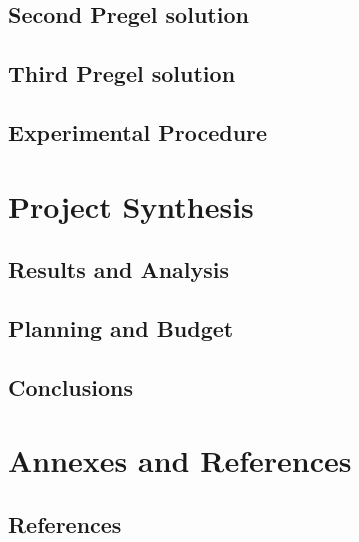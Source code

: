\documentclass{legrand}
\begin{document}
\chapter{Second Pregel solution}
\label{chapter:second}


\chapter{Third Pregel solution}
\label{chapter:third}


\chapter{Experimental Procedure}
\label{chapter:experiment}


\part{Project Synthesis}

\chapter{Results and Analysis}
\label{chapter:results}


\chapter{Planning and Budget}
\label{chapter:planning}


\chapter{Conclusions}
\label{chapter:conclusions}


\part{Annexes and References}

\chapter{References} %
\printbibliography[heading=bibempty]
\end{document}
